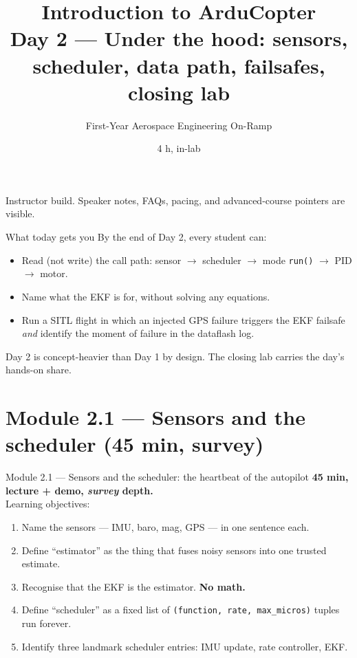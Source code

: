 \documentclass[aspectratio=169,11pt]{beamer}
\title{Introduction to ArduCopter\\\large Day 2 --- Under the hood: sensors, scheduler, data path, failsafes, closing lab}
\subtitle{First-Year Aerospace Engineering On-Ramp}
\date{4 h, in-lab}
\author{}
\institute{\copyrightline}
\begin{document}
\begin{frame}
  \titlepage
  \ifinstructor
    \footnotesize Instructor build. Speaker notes, FAQs, pacing, and advanced-course pointers are visible.
  \fi
\end{frame}

\begin{frame}{What today gets you}
  By the end of Day 2, every student can:
  \begin{itemize}
    \item Read (not write) the call path: sensor $\rightarrow$ scheduler $\rightarrow$ mode \texttt{run()} $\rightarrow$ PID $\rightarrow$ motor.
    \item Name what the EKF is for, without solving any equations.
    \item Run a SITL flight in which an injected GPS failure triggers the EKF failsafe \emph{and} identify the moment of failure in the dataflash log.
  \end{itemize}
  \vfill
  Day 2 is concept-heavier than Day 1 by design. The closing lab carries the day's hands-on share.
\end{frame}

\section{Module 2.1 --- Sensors and the scheduler (45 min, survey)}

\begin{frame}{Module 2.1 --- Sensors and the scheduler: the heartbeat of the autopilot}
  \textbf{45 min, lecture + demo, \emph{survey} depth.}\\[1ex]
  Learning objectives:
  \begin{enumerate}
    \item Name the sensors --- IMU, baro, mag, GPS --- in one sentence each.
    \item Define ``estimator'' as the thing that fuses noisy sensors into one trusted estimate.
    \item Recognise that the EKF is the estimator. \textbf{No math.}
    \item Define ``scheduler'' as a fixed list of \texttt{(function, rate, max\_micros)} tuples run forever.
    \item Identify three landmark scheduler entries: IMU update, rate controller, EKF.
  \end{enumerate}
\end{frame}
\end{document}
